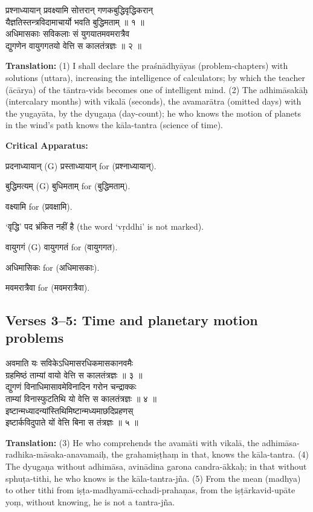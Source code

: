 \documentclass[11pt,a4paper]{article}
\newcommand{\dev}[1]{{\devanagarifont #1}}
\newcommand{\sanskritcol}[1]{%
  \begin{minipage}[t]{0.47\textwidth}
  \vspace{0pt}
  \begin{flushleft}
  #1
  \end{flushleft}
  \end{minipage}%
  \hfill
}
\newcommand{\englishcol}[1]{%
  \begin{minipage}[t]{0.47\textwidth}
  \vspace{0pt}
  \begin{flushleft}
  #1
  \end{flushleft}
  \end{minipage}%
}
\newenvironment{variants}{%
  \small%
  \color{varecolor}%
  \list{}{\leftmargin=2em\itemindent=-1em}%
}{\endlist}
\begin{document}
\noindent
\sanskritcol{\dev{प्रश्नाध्यायान् प्रवक्ष्यामि सोत्तरान् गणकबुद्धिवृद्धिकरान्} \\ \dev{यैज्ञतिस्तन्त्रविदामाचार्यो भवति बुद्धिमताम् ॥ १ ॥} \\[0.2cm]
\dev{अधिमासकाः सविकलाः सं युगयातमवमरात्रैव} \\ \dev{द्युगणेन वायुगगतयो वेत्ति स कालतंत्रज्ञः ॥ २ ॥}}
\englishcol{\textbf{Translation:} (1) I shall declare the praśnādhyāyas (problem-chapters) with
solutions (uttara), increasing the intelligence of calculators; by which the
teacher (ācārya) of the tāntra-vids becomes one of intelligent mind. (2) The
adhimāsakāḥ (intercalary months) with vikalā (seconds), the avamarātra (omitted
days) with the yugayāta, by the dyugaṇa (day-count); he who knows the motion of
planets in the wind's path knows the kāla-tantra (science of time).}

\vspace{0.4cm}
\textcolor{varecolor}{\textbf{Critical Apparatus:}}
\begin{variants}
\item[1.1] \dev{प्रदनाध्यायान्} (G) \dev{प्रस्ताध्यायान्} \dev{for} (\dev{प्रश्नाध्यायान्}).
\item[1.2] \dev{बुद्धिमत्यम्} (G) \dev{बुधिमताम्} \dev{for} (\dev{बुद्धिमताम्}).
\item[1.3] \dev{वक्ष्यामि} \dev{for} (\dev{प्रवक्षामि}).
\item[1.4] \dev{`वृद्धि' पद भ्रंकित नहीं है} (the word `vṛddhi' is not marked).
\item[2.1] \dev{वायुगगं} (G) \dev{वायुगगतं} \dev{for} (\dev{वायुगगत}).
\item[2.2] \dev{अधिमासिकः} \dev{for} (\dev{अधिमासकाः}).
\item[2.3] \dev{मवमरात्रैवा} \dev{for} (\dev{मवमरात्रैवा}).
\end{variants}

\subsection*{Verses 3--5: Time and planetary motion problems}

\noindent
\sanskritcol{\dev{अवमाति यः सविकेऽधिमासरधिकमासकानवमैः} \\ \dev{ग्रहमिष्ठं ताम्यां वायो वेत्ति स कालतंत्रज्ञः ॥ ३ ॥} \\[0.2cm]
\dev{द्युगणं विनाधिमासावमेविनादिन गरोन चन्द्राक्कः} \\ \dev{ताम्यां विनास्फुटतिथि यो वेत्ति स कालतंत्रज्ञः ॥ ४ ॥} \\[0.2cm]
\dev{इष्टान्मध्यादन्यांस्तिथिमिष्टान्मध्यमाछदिप्रहणस्} \\ \dev{इष्टार्कविदुपाते यों वेत्ति बिना स तंत्रज्ञः ॥ ५ ॥}}
\englishcol{\textbf{Translation:} (3) He who comprehends the avamāti with vikalā, the
adhimāsa-radhika-māsaka-anavamaiḥ, the grahamiṣṭhaṃ in that, knows the kāla-tantra.
(4) The dyugaṇa without adhimāsa, avinādina garona candra-ākkaḥ; in that without
sphuṭa-tithi, he who knows is the kāla-tantra-jña. (5) From the mean (madhya)
to other tithi from iṣṭa-madhyamā-cchadi-prahaṇas, from the iṣṭārkavid-upāte
yoṃ, without knowing, he is not a tantra-jña.}
\end{document}
